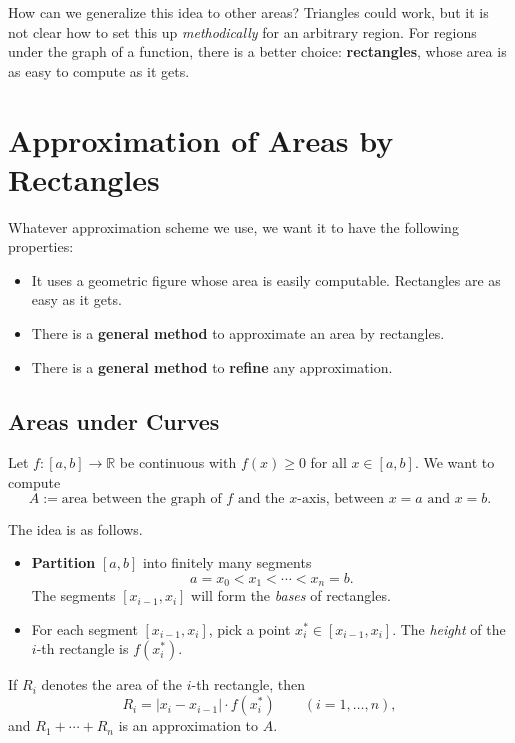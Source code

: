 \documentclass[
  letterpaper,
  DIV=11,
  numbers=noendperiod]{scrreprt}
\providecommand{\tightlist}{%
  \setlength{\itemsep}{0pt}\setlength{\parskip}{0pt}}
\theoremstyle{plain}
\theoremstyle{plain}
\theoremstyle{definition}
\theoremstyle{definition}
\theoremstyle{definition}
\theoremstyle{plain}
\theoremstyle{plain}
\theoremstyle{remark}
\begin{document}
How can we generalize this idea to other areas? Triangles could work,
but it is not clear how to set this up \emph{methodically} for an
arbitrary region. For regions under the graph of a function, there is a
better choice: \textbf{rectangles}, whose area is as easy to compute as
it gets.

\section{Approximation of Areas by
Rectangles}\label{approximation-of-areas-by-rectangles}

Whatever approximation scheme we use, we want it to have the following
properties:

\begin{itemize}
\tightlist
\item
  It uses a geometric figure whose area is easily computable. Rectangles
  are as easy as it gets.
\item
  There is a \textbf{general method} to approximate an area by
  rectangles.
\item
  There is a \textbf{general method} to \textbf{refine} any
  approximation.
\end{itemize}

\subsection{Areas under Curves}\label{areas-under-curves}

Let \(f\colon[a,b]\to\mathbb{R}\) be continuous with \(f(x)\ge0\) for
all \(x\in[a,b]\). We want to compute \[
A := \text{area between the graph of $f$ and the $x$-axis, between $x=a$ and $x=b$}.
\]

The idea is as follows.

\begin{itemize}
\tightlist
\item
  \textbf{Partition} \([a,b]\) into finitely many segments \[
  a = x_0 < x_1 < \cdots < x_n = b.
  \] The segments \([x_{i-1},x_i]\) will form the \emph{bases} of
  rectangles.
\item
  For each segment \([x_{i-1},x_i]\), pick a point
  \(x_i^*\in[x_{i-1},x_i]\). The \emph{height} of the \(i\)-th rectangle
  is \(f(x_i^*)\).
\end{itemize}

If \(R_i\) denotes the area of the \(i\)-th rectangle, then \[
R_i = \lvert x_i - x_{i-1} \rvert\cdot f(x_i^*) \qquad (i=1,\ldots,n),
\] and \(R_1+\cdots+R_n\) is an approximation to \(A\).
\end{document}
